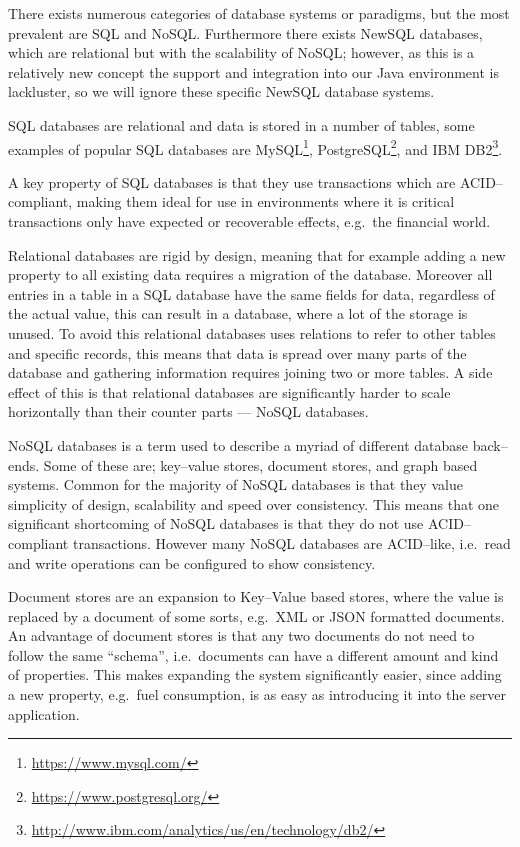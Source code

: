 \bigskip
There exists numerous categories of database systems or paradigms, but the most prevalent are SQL and NoSQL.
Furthermore there exists NewSQL databases, which are relational but with the scalability of NoSQL;
however, as this is a relatively new concept the support and integration into our Java environment is lackluster, so we will ignore these specific NewSQL database systems.

SQL databases are relational and data is stored in a number of tables, some examples of popular SQL databases are MySQL\footnote{\url{https://www.mysql.com/}}, PostgreSQL\footnote{\url{https://www.postgresql.org/}}, and IBM DB2\footnote{\url{http://www.ibm.com/analytics/us/en/technology/db2/}}.\cite{DB_RANKINGS}

A key property of SQL databases is that they use transactions which are ACID--compliant\cite{Haerder:1983:PTD:289.291}, making them ideal for use in environments where it is critical transactions only have expected or recoverable effects, e.g.~the financial world.

Relational databases are rigid by design, meaning that for example adding a new property to all existing data requires a migration of the database.
Moreover all entries in a table in a SQL database have the same fields for data, regardless of the actual value, this can result in a database, where a lot of the storage is unused.
To avoid this relational databases uses relations to refer to other tables and specific records, this means that data is spread over many parts of the database and gathering information requires joining two or more tables.
A side effect of this is that relational databases are significantly harder to scale horizontally than their counter parts --- NoSQL databases.

\bigskip
NoSQL databases is a term used to describe a myriad of different database back--ends.
Some of these are; key--value stores, document stores, and graph based systems.
Common for the majority of NoSQL databases is that they value simplicity of design, scalability and speed over consistency.
This means that one significant shortcoming of NoSQL databases is that they do not use ACID--compliant transactions.
However many NoSQL databases are ACID--like, i.e.~read and write operations can be configured to show consistency.

Document stores are an expansion to Key--Value based stores, where the value is replaced by a document of some sorts, e.g.~XML or JSON formatted documents.
An advantage of document stores is that any two documents do not need to follow the same ``schema'', i.e.~documents can have a different amount and kind of properties.
This makes expanding the system significantly easier, since adding a new property, e.g.~fuel consumption, is as easy as introducing it into the server application.

